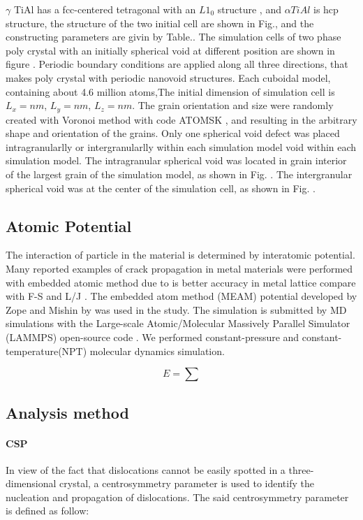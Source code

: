 \documentclass[preview,times]{elsarticle}
\begin{document}
$\gamma $ TiAl has a fcc-centered tetragonal with an $L1_0$ structure \cite{}, and $\alpha TiAl$ is hcp structure, the structure of the two initial cell are shown in Fig.\cite{}, and the constructing parameters are givin by Table.\cite{}. The simulation cells of two phase poly crystal with an initially spherical void at different position are shown in figure \cite{}. Periodic boundary conditions are applied along all three directions, that makes poly crystal with periodic nanovoid structures. Each cuboidal model, containing about 4.6 million atoms,The initial dimension of simulation cell is  $L_x = nm$, $L_y =  nm$, $L_z =  nm$. The grain orientation and size were randomly created with Voronoi method with code ATOMSK \cite{}, and resulting in the arbitrary shape and orientation of the grains. Only one spherical void defect was placed intragranularlly or intergranularlly within each simulation model void within each simulation model. The intragranular spherical void was located in grain interior of the largest grain of the simulation model, as shown in Fig. \cite{}. The intergranular spherical void was at the center of the simulation cell, as shown in Fig. \cite{}.

\subsection{Atomic Potential}
The interaction of particle in the material is determined by interatomic potential. Many reported examples of crack propagation in metal materials were performed with embedded atomic method due to is better accuracy in metal lattice compare with F-S and L/J \cite{}. The embedded atom method (MEAM) potential developed by Zope and Mishin by \cite{} was used in the study. The simulation is submitted by MD simulations with the Large-scale Atomic/Molecular Massively Parallel Simulator (LAMMPS) open-source code \cite{}. We performed constant-pressure and constant-temperature(NPT) molecular dynamics simulation.


\begin{equation} \label{eq:eam} 
	E= \displaystyle\sum
\end{equation}

\subsection{Analysis method}
\paragraph{CSP}
In view of the fact that dislocations cannot be easily spotted in a three-dimensional crystal, a centrosymmetry parameter \cite{} is used to identify the nucleation and propagation of dislocations. The said centrosymmetry parameter is defined as follow:
\end{document}
